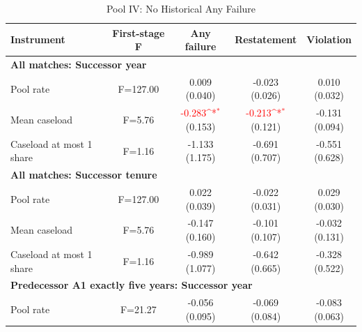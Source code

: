 \begin{table}[htbp]
\footnotesize
\def\sym#1{\ifmmode^{#1}\else\(^{#1}\)\fi}
\centering
\caption{Pool IV: No Historical Any Failure}
\begin{threeparttable}
\begin{tabular}{p{}cccc}
\toprule
Instrument & First-stage F & Any failure & Restatement & Violation \\
\midrule
\multicolumn{5}{l}{\textbf{All matches: Successor year}} \\
Pool rate & F=127.00 & \shortstack{0.009\\(0.040)} & \shortstack{-0.023\\(0.026)} & \shortstack{0.010\\(0.032)} \\
Mean caseload & F=5.76 & \shortstack{\textcolor{red}{-0.283\sym{*}}\\(0.153)} & \shortstack{\textcolor{red}{-0.213\sym{*}}\\(0.121)} & \shortstack{-0.131\\(0.094)} \\
Caseload at most 1 share & F=1.16 & \shortstack{-1.133\\(1.175)} & \shortstack{-0.691\\(0.707)} & \shortstack{-0.551\\(0.628)} \\
\multicolumn{5}{l}{\textbf{All matches: Successor tenure}} \\
Pool rate & F=127.00 & \shortstack{0.022\\(0.039)} & \shortstack{-0.022\\(0.031)} & \shortstack{0.029\\(0.030)} \\
Mean caseload & F=5.76 & \shortstack{-0.147\\(0.160)} & \shortstack{-0.101\\(0.107)} & \shortstack{-0.032\\(0.131)} \\
Caseload at most 1 share & F=1.16 & \shortstack{-0.989\\(1.077)} & \shortstack{-0.642\\(0.665)} & \shortstack{-0.328\\(0.522)} \\
\multicolumn{5}{l}{\textbf{Predecessor A1 exactly five years: Successor year}} \\
Pool rate & F=21.27 & \shortstack{-0.056\\(0.095)} & \shortstack{-0.069\\(0.084)} & \shortstack{-0.083\\(0.063)} \\

\end{tabular}
\end{threeparttable}
\end{table}
